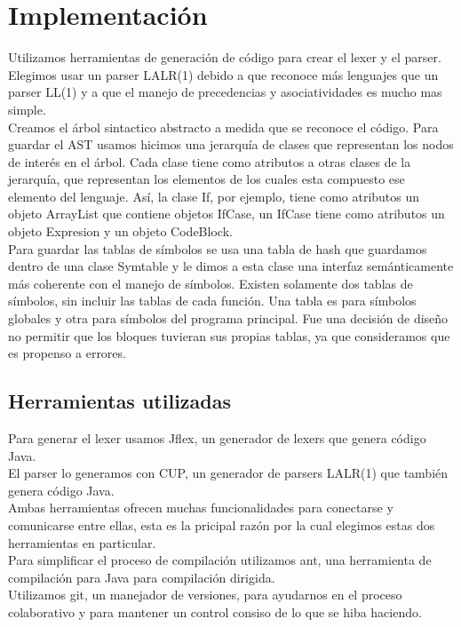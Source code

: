 \documentclass[12pt, spanish]{report}
\begin{document}
\chapter{Implementación}
\label{chap:impl}
Utilizamos herramientas de generación de código para crear el lexer y
el parser. Elegimos usar un parser LALR(1) debido a que reconoce más
lenguajes que un parser LL(1) y a que el manejo de precedencias y
asociatividades es mucho mas simple.\\
Creamos el árbol sintactico abstracto a medida que se reconoce el
código. Para guardar el AST usamos hicimos una jerarquía
de clases que representan los nodos de interés en el árbol. Cada clase
tiene como atributos a otras clases de la jerarquía, que representan los
elementos de los cuales esta compuesto ese elemento del lenguaje. Así,
la clase If, por ejemplo, tiene como atributos un objeto ArrayList que
contiene objetos IfCase, un IfCase tiene como atributos un objeto
Expresion y un objeto CodeBlock.\\
Para guardar las tablas de símbolos se usa una tabla de hash que
guardamos dentro de una clase Symtable y le dimos a esta clase una interfaz
semánticamente más coherente con el manejo de símbolos.
Existen solamente dos tablas de s\'imbolos, sin incluir las tablas de
cada funci\'on. Una tabla es para s\'imbolos globales y otra para
s\'imbolos del programa principal. Fue una decisi\'on de
dise\~no no permitir que los bloques tuvieran sus propias tablas, ya que
consideramos que es propenso a errores.

\section{Herramientas utilizadas}
\label{sec:herramientas}
Para generar el lexer usamos Jflex, un generador de lexers que genera
código Java.\\
El parser lo generamos con CUP, un generador de parsers LALR(1) que
también genera código Java.\\
Ambas herramientas ofrecen muchas funcionalidades para conectarse y
comunicarse entre ellas, esta es la pricipal razón por la cual elegimos
estas dos herramientas en particular.\\
Para simplificar el proceso de compilación utilizamos ant, una
herramienta de compilación para Java para compilación dirigida.\\
Utilizamos git, un manejador de versiones, para ayudarnos en el proceso
colaborativo y para mantener un control consiso de lo que se hiba
haciendo.
\end{document}
